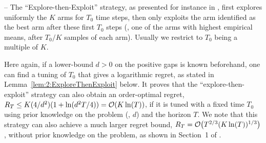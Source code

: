 -- The ``\textcolor{deepgold}{Explore-then-Exploit}'' strategy, as presented for instance in \cite{Bubeck12}, first explores uniformly the $K$ arms for $T_0$ time steps, then only exploits the arm identified as the best arm after these first $T_0$ steps
(\ie, one of the arms with highest empirical means, after $T_0/K$ samples of each arm).
Usually we restrict to $T_0$ being a multiple of $K$.

Here again, if a lower-bound $d>0$ on the positive gaps is known beforehand, one can find a tuning of $T_0$ that gives a logarithmic regret, as stated in Lemma~\ref{lem:2:ExploreThenExploit} below.
It proves that the ``explore-then-exploit'' strategy can also obtain an order-optimal regret, $R_T \leq K (4/d^2) (1 + \ln(d^2 T / 4)) = \mathop{}\mathopen{}\mathcal{O}\mathopen{}\left(K \ln(T)\right)$, if it is tuned with a fixed time $T_0$ using prior knowledge on the problem (\ie, $d$) and the horizon $T$.
%
%
We note that this strategy can also achieve a much larger regret bound, $R_T = \mathop{}\mathopen{}\mathcal{O}\mathopen{}\left(T^{2/3} (K \ln(T))^{1/3}\right)$, without prior knowledge on the problem, as shown in Section~1 of \cite{Slivkins2019}.

